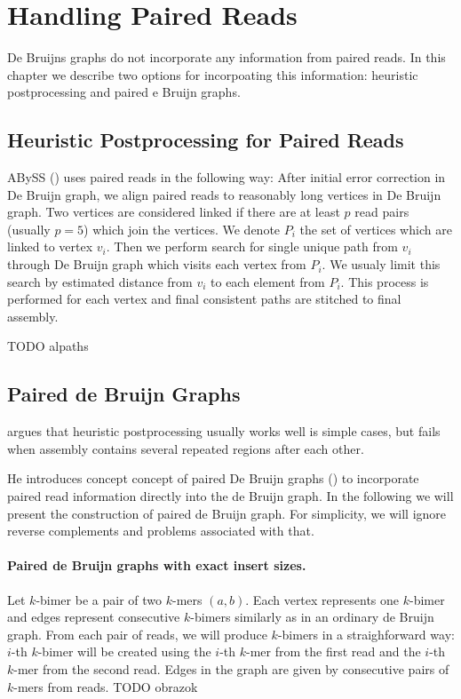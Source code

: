 \section{Handling Paired Reads}

De Bruijns graphs do not incorporate any information from paired reads.
In this chapter we describe two options for incorpoating this information:
heuristic postprocessing and paired e Bruijn graphs.

\subsection{Heuristic Postprocessing for Paired Reads}

ABySS (\cite{Abyss}) uses paired reads in the following way:
After initial error correction in De Bruijn graph, we align paired reads
to reasonably long vertices in De Bruijn graph. Two vertices are considered linked
if there are at least $p$ read pairs (usually $p=5$) which join the vertices.
We denote $P_i$ the set of vertices which are linked to vertex $v_i$.
Then we perform search for single unique path from $v_i$ through De Bruijn graph which visits
each vertex from $P_i$. We usualy limit this search by estimated distance from $v_i$ to each element
from $P_i$. This process is performed for each vertex and final consistent paths are stitched to final assembly.

TODO alpaths

\subsection{Paired de Bruijn Graphs}

\citet{Paired} argues that heuristic postprocessing
usually works well is simple cases, but fails when assembly contains
several repeated regions after each other.

He introduces concept concept of paired De Bruijn graphs (\cite{Paired}) to incorporate paired read
information directly into the de Bruijn graph.
In the following we will present the construction of 
paired de Bruijn graph.
For simplicity, we will ignore reverse complements and problems associated with that.

\paragraph{Paired de Bruijn graphs with exact insert sizes.}
Let $k$-bimer be a pair of two $k$-mers $(a, b)$. Each vertex 
represents one $k$-bimer and edges represent
consecutive $k$-bimers similarly as in an ordinary de Bruijn graph. 
From each pair of reads, we will produce $k$-bimers in a straighforward way:
$i$-th $k$-bimer will be created using the $i$-th $k$-mer from the first read and 
the $i$-th $k$-mer from the second read.
Edges in the graph are given by consecutive pairs of $k$-mers from reads.
TODO obrazok

